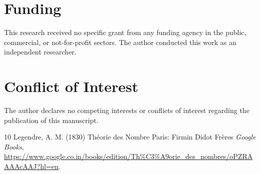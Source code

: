 \documentclass[10 pt,a4paper, article]{amsart}
\begin{document}
\section{Funding} 

This research received no specific grant from any funding agency in the public, commercial, or not-for-profit sectors. The author conducted this work as an independent researcher.

\section{Conflict of Interest}

The author declares no competing interests or conflicts of interest regarding the publication of this manuscript.

\begin{thebibliography}{10}
Legendre, A. M. (1830)
\newblock Théorie des Nombre
\newblock Paris: Firmin Didot Frères
\emph{Google Books},
\url{https://www.google.co.in/books/edition/Th%C3%A9orie_des_nombres/oPZRAAAAcAAJ?hl=en}.

\end{thebibliography}
\end{document}
